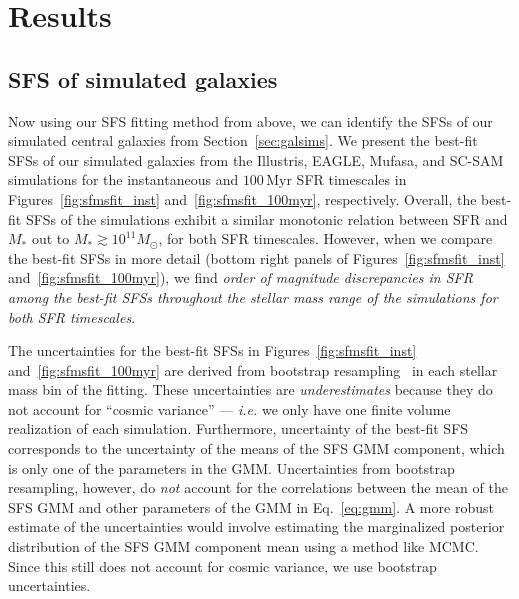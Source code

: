 \documentclass[preprint2,tighten]{aastex62}
\begin{document}
\section{Results} \label{sec:results}
\subsection{SFS of simulated galaxies} \label{sec:sfs}
Now using our SFS fitting method from above, %
we can identify the SFSs of our simulated central galaxies from 
Section~\ref{sec:galsims}. We present the best-fit SFSs of our
simulated galaxies from the Illustris, EAGLE, {\sc Mufasa}, and SC-SAM 
simulations for the instantaneous and $100\,\mathrm{Myr}$ SFR 
timescales in Figures~\ref{fig:sfmsfit_inst} and~\ref{fig:sfmsfit_100myr}, 
respectively. %
Overall, the best-fit SFSs of the simulations exhibit a similar monotonic
relation between SFR and $M_*$ out to $M_* \gtrsim 10^{11}M_\odot$, for 
both SFR timescales. However, when we compare the best-fit SFSs in more
detail (bottom right panels of Figures~\ref{fig:sfmsfit_inst} 
and~\ref{fig:sfmsfit_100myr}), we find \emph{order of magnitude discrepancies 
in SFR among the best-fit SFSs throughout the stellar mass range of the 
simulations for both SFR timescales}. 

The uncertainties for the best-fit SFSs in Figures~\ref{fig:sfmsfit_inst} 
and~\ref{fig:sfmsfit_100myr} are derived from bootstrap resampling~\citep{efron1979} 
in each stellar mass bin of the fitting. These uncertainties are 
\emph{underestimates} because they do not account for 
``cosmic variance'' --- \emph{i.e.} we only have one finite volume realization 
of each simulation. Furthermore, uncertainty of the best-fit SFS corresponds 
to the uncertainty of the means of the SFS GMM component, which is only one 
of the parameters in the GMM. Uncertainties from bootstrap resampling, 
however, do \emph{not} account for the correlations between the mean of 
the SFS GMM and other parameters of the GMM in Eq.~\ref{eq:gmm}. A more 
robust estimate of the uncertainties would involve estimating the marginalized 
posterior distribution of the SFS GMM component mean using a method like MCMC. 
Since this still does not account for cosmic variance, we use bootstrap 
uncertainties. 
\end{document}
